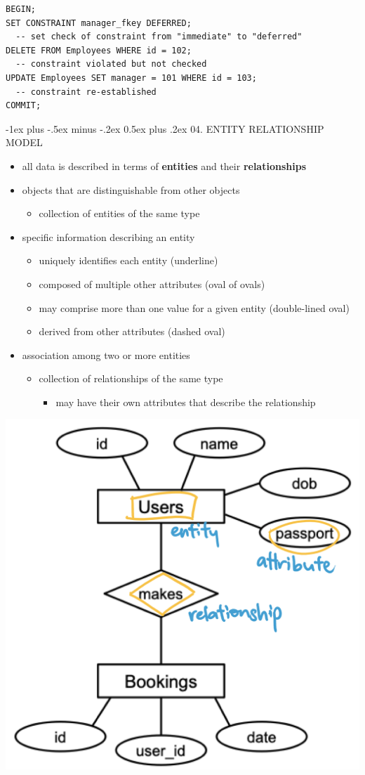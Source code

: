 \documentclass[10pt, landscape]{article}
\makeatletter
\renewcommand{\section}{\@startsection{section}{1}{0mm}%
  {-1ex plus -.5ex minus -.2ex}%
  {0.5ex plus .2ex}%
{\normalfont\large\bfseries}}
\makeatother
\begin{document}
\begin{multicols}{3}
\begin{lstlisting}[style=mySQL]
BEGIN;
SET CONSTRAINT manager_fkey DEFERRED; 
  -- set check of constraint from "immediate" to "deferred"
DELETE FROM Employees WHERE id = 102; 
  -- constraint violated but not checked
UPDATE Employees SET manager = 101 WHERE id = 103; 
  -- constraint re-established
COMMIT;
  \end{lstlisting}

  \section{04. ENTITY RELATIONSHIP MODEL}
  \begin{itemize}
    \item all data is described in terms of \textbf{entities} and their \textbf{relationships}
    \item {} objects that are distinguishable from other objects
      \begin{itemize}
        \item {} collection of entities of the same type
      \end{itemize}
    \item {} specific information describing an entity
      \begin{itemize}
        \item {} uniquely identifies each entity (underline)
        \item {} composed of multiple other attributes (oval of ovals)
        \item {} may comprise more than one value for a given entity (double-lined oval)
        \item {} derived from other attributes (dashed oval)
      \end{itemize}
    \item {} association among two or more entities
      \begin{itemize}
        \item {} collection of relationships of the same type
          \begin{itemize}
            \item may have their own attributes that describe the relationship
          \end{itemize}
      \end{itemize}
  \end{itemize}
  \includegraphics[width=0.4\linewidth]{cs2102-entity-relationship-model.png} 

\end{multicols}
\end{document}
